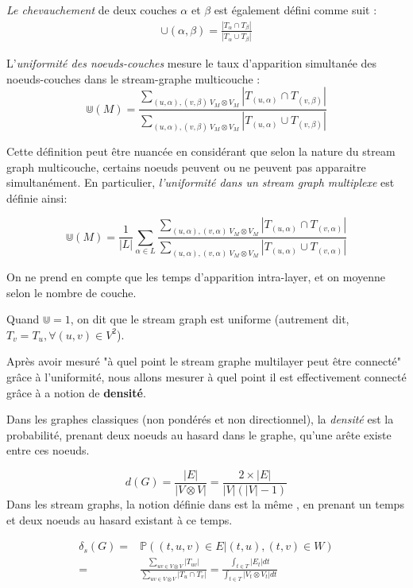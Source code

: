 \documentclass[11pt,a4paper]{article}
\theoremstyle{definition}
\theoremstyle{remark}
\theoremstyle{remark}
\begin{document}
	{\em Le chevauchement} de deux couches $\alpha$ et $\beta$ est également défini comme suit :
	\begin{align*}
		\cup(\alpha,\beta) = \frac{|T_{\alpha}\cap T_{\beta}|}{|T_{\alpha}\cup T_{\beta}|}
	\end{align*}

    L'{\em uniformité des noeuds-couches} mesure le taux d'apparition simultanée des noeuds-couches dans le stream-graphe multicouche :
    \[
    	\Cup(M) = \frac{\sum_{(u,\alpha),(v,\beta) \ V_M \otimes V_M}{|T_{(u,\alpha)} \cap T_{(v,\beta)}|}}{\sum_{(u,\alpha),(v,\beta) \ V_M \otimes V_M}{|T_{(u,\alpha)}\cup T_{(v,\beta)}|}}
    \]
	
	Cette définition peut être nuancée en considérant que selon la nature du stream graph multicouche, certains noeuds peuvent ou ne peuvent pas apparaitre simultanément. En particulier, {\em l'uniformité dans un stream graph multiplexe} est définie ainsi:	
	
	\[
    	\Cup(M) = \frac{1}{|L|}\sum_{\alpha \in L} \frac{\sum_{(u,\alpha),(v,\alpha) \ V_M \otimes V_M}{|T_{(u,\alpha)} \cap T_{(v,\alpha)}|}}{\sum_{(u,\alpha),(v,\alpha) \ V_M \otimes V_M}{|T_{(u,\alpha)}\cup T_{(v,\alpha)}|}}
    \]
    
    On ne prend en compte que les temps d'apparition intra-layer, et on moyenne selon le nombre de couche. 


	Quand $\Cup=1$, on dit que le stream graph est uniforme (autrement dit, $T_v = T_u, \forall (u,v) \in V^2$).


    Après avoir mesuré "à quel point le stream graphe multilayer peut être connecté" grâce à l'uniformité, nous allons mesurer à quel point il est effectivement connecté grâce à a notion de \textbf{densité}.
    
    Dans les graphes classiques (non pondérés et non directionnel), la {\em densité} est la probabilité, prenant deux noeuds au hasard dans le graphe, qu'une arête existe entre ces noeuds.
    
		\[
			d(G) = \frac{|E|}{|V\otimes V|} = \frac{2\times |E|}{|V|(|V|-1)}
		\]
	Dans les stream graphs, la notion définie dans \cite{stream} est la même , en prenant un temps et deux noeuds au hasard existant à ce temps. 	

		\begin{align*}
			\delta_s(G) = & \mathbb{P}((t,u,v)\in E| (t,u),(t,v) \in W) \\
			 =  & \frac{\sum_{uv \in V \otimes V}{|T_{uv}|}}{\sum_{uv \in V\otimes V}{|T_u\cap T_v|}}= \frac{\int_{t\in T}{|E_t|dt}}{\int_{t\in T}{|V_t\otimes V_t|dt}}
		\end{align*}
		
\end{document}
